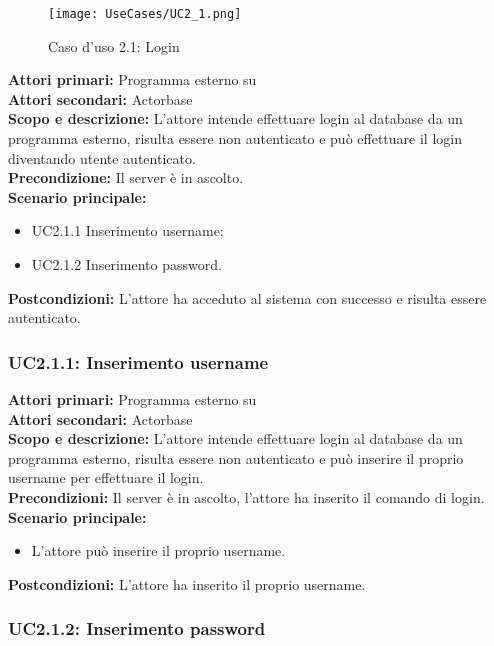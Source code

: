 \documentclass{scalatekids-article}
\begin{document}
\begin{figure}[H]
  \begin{center}
    \texttt{[image: UseCases/UC2\_1.png]}
    \caption{Caso d'uso 2.1: Login}
  \end{center}
\end{figure}
\textbf{Attori primari:} Programma esterno su \\
\textbf{Attori secondari:} Actorbase\\
\textbf{Scopo e descrizione:}
L'attore intende effettuare login al database da un programma  esterno, risulta essere non autenticato e può effettuare il login diventando utente autenticato.\\
\textbf{Precondizione:} Il server è in ascolto.\\
\textbf{Scenario principale:}
\begin{itemize}
\item UC2.1.1 Inserimento username;
\item UC2.1.2 Inserimento password.
\end{itemize}
\textbf{Postcondizioni:} L'attore ha acceduto al sistema con successo e risulta essere autenticato.

\subsubsection{UC2.1.1: Inserimento username}

\textbf{Attori primari:} Programma esterno su \\
\textbf{Attori secondari:} Actorbase\\
\textbf{Scopo e descrizione:}
L'attore intende effettuare login al database da un programma  esterno, risulta essere non autenticato e può inserire il proprio username per effettuare il login.\\
\textbf{Precondizioni:} Il server è in ascolto, l'attore ha inserito il comando di login.\\
\textbf{Scenario principale:}
\begin{itemize}
\item L'attore può inserire il proprio username.
\end{itemize}
\textbf{Postcondizioni:} L'attore ha inserito il proprio username.

\subsubsection{UC2.1.2: Inserimento password}
\end{document}
